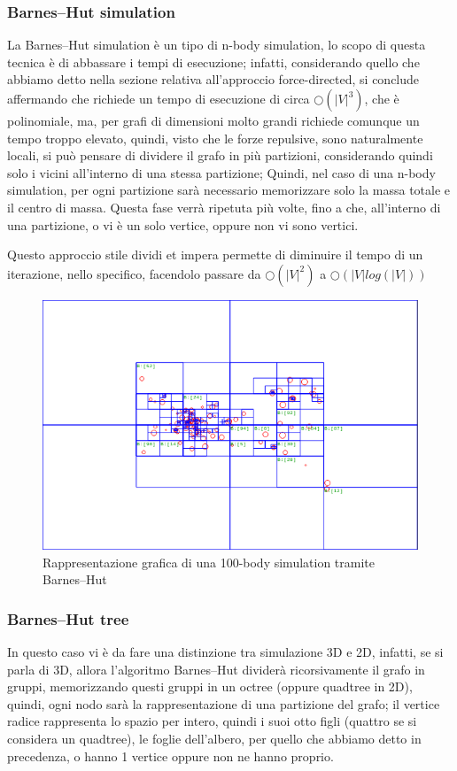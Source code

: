 \documentclass[12pt,a4paper]{article}
\begin{document}
\subsubsection{Barnes–Hut simulation}
La Barnes–Hut simulation è un tipo di n-body simulation, lo scopo di questa tecnica è di abbassare i tempi di esecuzione; infatti, considerando quello che abbiamo detto nella sezione relativa all'approccio force-directed, si conclude affermando che richiede un tempo di esecuzione di circa $\bigcirc({\vert V \vert}^3)$, che è polinomiale, ma, per grafi di dimensioni molto grandi richiede comunque un tempo troppo elevato, quindi, visto che le forze repulsive, sono naturalmente locali, si può pensare di dividere il grafo in più partizioni, considerando quindi solo i vicini all'interno di una stessa partizione; Quindi, nel caso di una n-body simulation, per ogni partizione sarà necessario memorizzare solo la massa totale e il centro di massa. Questa fase verrà ripetuta più volte, fino a che, all'interno di una partizione, o vi è un solo vertice, oppure non vi sono vertici.

Questo approccio stile dividi et impera permette di diminuire il tempo di un iterazione, nello specifico, facendolo passare da $\bigcirc({\vert V \vert}^2)$ a $\bigcirc({\vert V \vert log(\vert V \vert)})$

\begin{figure}[h]
	\centering
	\includegraphics[width=0.8\linewidth]{img/2D_Quad-Tree_partitioning_of_100_bodies.png}
	\caption{Rappresentazione grafica di una 100-body simulation tramite Barnes–Hut}
	\label{fig:Barnes–Hut}
\end{figure}

\subsubsection{Barnes–Hut tree}
In questo caso vi è da fare una distinzione tra simulazione 3D e 2D, infatti, se si parla di 3D, allora l'algoritmo Barnes–Hut dividerà ricorsivamente il grafo in gruppi, memorizzando questi gruppi in un octree (oppure quadtree in 2D), quindi, ogni nodo sarà la rappresentazione di una partizione del grafo; il vertice radice rappresenta lo spazio per intero, quindi i suoi otto figli (quattro se si considera un quadtree), le foglie dell'albero, per quello che abbiamo detto in precedenza, o hanno 1 vertice oppure non ne hanno proprio.
\end{document}
